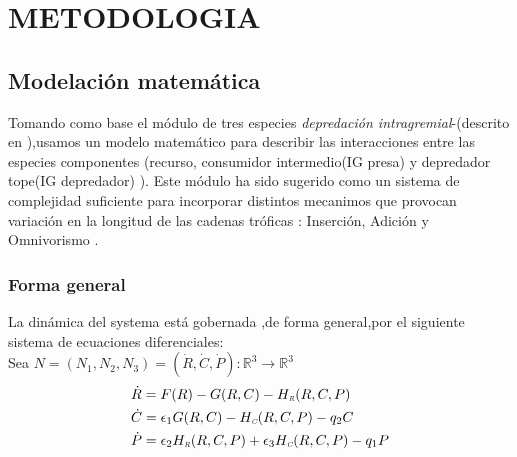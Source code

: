 \section{METODOLOGIA}

\subsection{Modelaci\'on matem\'atica}

Tomando como base el m\'odulo de tres especies \emph{depredaci\'on intragremial}-(descrito en \citealt{polis1989ecology,polis1992intraguild}),usamos un modelo matem\'atico \citep{holt1997theoretical} para describir las interacciones entre las especies componentes (recurso, consumidor intermedio(IG presa) y depredador tope(IG depredador) ). Este m\'odulo ha sido sugerido como un sistema de complejidad suficiente para incorporar distintos mecanimos que provocan variaci\'on en la longitud de las cadenas tr\'oficas : Inserci\'on, Adici\'on y Omnivorismo \citep{TP2007proximate}.

\subsubsection{Forma general}
La din\'amica del systema est\'a gobernada ,de forma general,por el siguiente sistema de ecuaciones diferenciales: \\
Sea $ N= (N_1,N_2,N_3) = (\dot{R} , \dot{C} , \dot{P}) : \mathbb{R}^3 \to \mathbb{R}^3 $
\begin{equation}\label{eq:Gsystem}
\begin{aligned}
&\dot{R} = F(R) -G(R,C)-H_{\textit{\tiny R}}(R,C,P)  \\
&\dot{C} = \epsilon_1 G(R,C)-H_{\textit{\tiny C}}(R,C,P) - q_2 C  \\
&\dot{P} = \epsilon_2 H_{\textit{\tiny R}}(R,C,P) +\epsilon_3 H_{\textit{\tiny C}}(R,C,P) -q_1 P
\end{aligned}
\end{equation}
